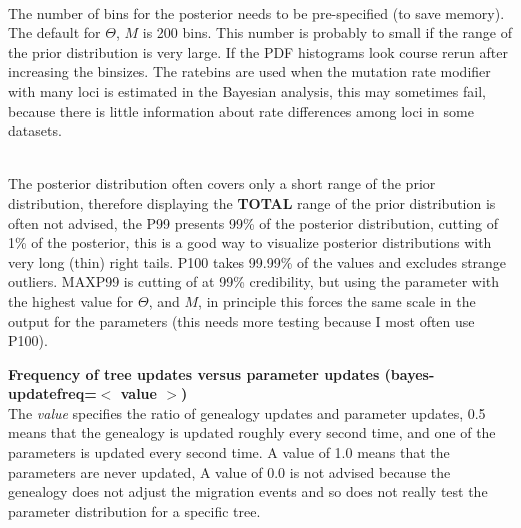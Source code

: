 \begin{description}
\item{}\\
The number of bins for the posterior needs to be pre-specified (to save memory). The default for $\Theta$, $M$ is 200 bins.
This number is probably to small if the range of the prior distribution is very large. If the PDF histograms look course rerun after increasing the binsizes. The ratebins are used when the mutation rate modifier with many loci is estimated in the Bayesian analysis,
this may sometimes fail, because there is little information about rate differences among loci in some datasets.

\item{}\\
The posterior distribution often covers only a short range of the prior distribution, therefore displaying the {\bf TOTAL} range of the prior distribution is often not advised, the P99 presents 99\% of the posterior distribution, cutting of 1\% of the posterior, this is a good way to visualize posterior distributions with very long (thin) right tails. P100 takes 99.99\% of the values and excludes strange outliers. MAXP99 is cutting of at 99\% credibility, but using the parameter with the highest value  for $\Theta$, and $M$, in principle this forces the same scale in the output for the parameters (this needs more testing because I most often use P100).

\item{\bf Frequency of tree updates versus parameter updates  (bayes-updatefreq=$<$ value $>$)}\\
The \textsl{value} specifies the ratio of genealogy updates and parameter updates, 0.5 means that the genealogy is updated roughly every second time, and one of the parameters is updated every second time. A value of 1.0 means that the parameters are never updated, A value of 0.0 is not advised because the genealogy does not adjust the migration events and so does not really test the parameter distribution for a specific tree.


\end{description}
